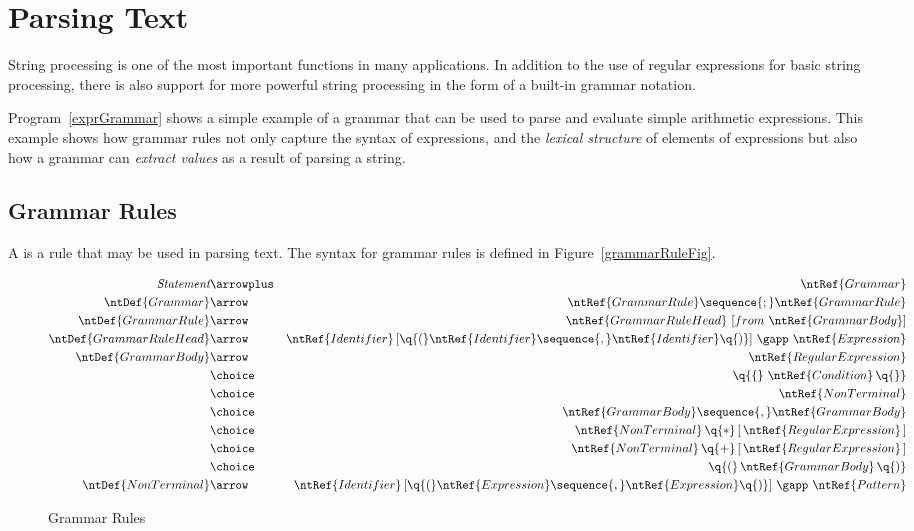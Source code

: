 \chapter{Parsing Text}
\label{parsing}

String processing is one of the most important functions in many applications. In addition to the use of regular expressions for basic string processing, there is also support for more powerful string processing in the form of a built-in grammar notation.

Program~\vref{exprGrammar} shows a simple example of a grammar that can be used to parse and evaluate simple arithmetic expressions. This example shows how grammar rules not only capture the syntax of expressions, and the \emph{lexical structure} of elements of expressions but also how a grammar can \emph{extract values} as a result of parsing a string.

\section{Grammar Rules}
\label{grammarRules}

A  is a rule that may be used in parsing text. The syntax for grammar rules is defined in Figure~\vref{grammarRuleFig}.

\begin{figure}[htbp]
\begin{eqnarray*}
\emph{Statement}&\arrowplus&\ntRef{Grammar}\\
\ntDef{Grammar}&\arrow&\ntRef{GrammarRule}\sequence{;}\ntRef{GrammarRule}\\
\ntDef{GrammarRule}&\arrow&\ntRef{GrammarRuleHead}\ [from\ \ntRef{GrammarBody}]\\
\ntDef{GrammarRuleHead}&\arrow&\ntRef{Identifier}\,[\q{(}\ntRef{Identifier}\sequence{,}\ntRef{Identifier}\q{)}]\ \gapp\ \ntRef{Expression}\\
\ntDef{GrammarBody}&\arrow&\ntRef{RegularExpression}\\
&\choice&\q{\{}\ \ntRef{Condition}\,\q{\}}\\
&\choice&\ntRef{NonTerminal}\\
&\choice&\ntRef{GrammarBody}\sequence{,}\ntRef{GrammarBody}\\
&\choice&\ntRef{NonTerminal}\, \q{*}\,[\,\ntRef{RegularExpression}\,]\\
&\choice&\ntRef{NonTerminal}\, \q{+}\,[\,\ntRef{RegularExpression}\,]\\
&\choice&\q{(}\, \ntRef{GrammarBody}\, \q{)}\\
\ntDef{NonTerminal}&\arrow&\ntRef{Identifier}\,[\q{(}\ntRef{Expression}\sequence{,}\ntRef{Expression}\q{)}]\ \gapp\ \ntRef{Pattern}
\end{eqnarray*}
\caption{Grammar Rules}
\label{grammarRuleFig}
\end{figure}

